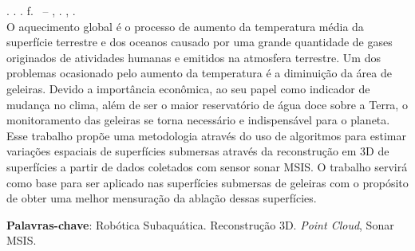 
\begin{resumo}[RESUMO]
\begin{SingleSpacing}

\imprimirautorcitacao. \imprimirtitulo. \imprimirdata. \pageref {LastPage} f. \imprimirprojeto\ – \imprimirprograma, \imprimirinstituicao. \imprimirlocal, \imprimirdata.\\

O aquecimento global é o processo de aumento da temperatura média da superfície terrestre e dos oceanos causado por uma grande quantidade de gases originados de atividades humanas e emitidos na atmosfera terrestre. Um dos problemas ocasionado pelo aumento da temperatura é a diminuição da área de geleiras. Devido a importância econômica, ao seu papel como indicador de mudança no clima, além de ser o maior reservatório de água doce sobre a Terra, o monitoramento das geleiras se torna necessário e indispensável para o planeta. Esse trabalho propõe uma metodologia através do uso de algoritmos para estimar variações espaciais de superfícies submersas através da  reconstrução em 3D de superfícies a partir de dados coletados com sensor sonar MSIS. O trabalho servirá como base para ser aplicado nas superfícies submersas de geleiras com o propósito de obter uma melhor mensuração da ablação dessas superfícies.



\vspace{2em}
\textbf{Palavras-chave}: Robótica Subaquática. Reconstrução 3D. \textit{Point Cloud}, Sonar MSIS.

\end{SingleSpacing}
\end{resumo}

